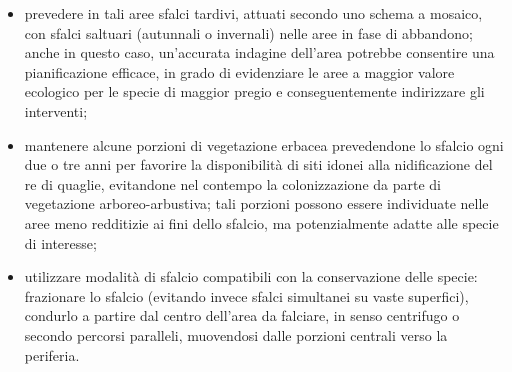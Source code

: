\documentclass[10pt,twoside,openany,x11names,svgnames,italian,a5paper,dvipsnames,table]{memoir}
\begin{document}
\begin{itemize}\itemsep0pt
  \item prevedere in tali aree sfalci tardivi, attuati secondo uno schema a mosaico, con sfalci saltuari (autunnali o invernali) nelle aree in fase di abbandono; anche in questo caso, un’accurata indagine dell’area potrebbe consentire una pianificazione efficace, in grado di evidenziare le aree a maggior valore ecologico per le specie di maggior pregio e conseguentemente indirizzare gli interventi;
  \item mantenere alcune porzioni di vegetazione erbacea prevedendone lo sfalcio ogni due o tre anni per favorire la disponibilità di siti idonei alla nidificazione del re di quaglie, evitandone nel contempo la colonizzazione da parte di vegetazione arboreo-arbustiva; tali porzioni possono essere individuate nelle aree meno redditizie ai fini dello sfalcio, ma potenzialmente adatte alle specie di interesse;
  \item utilizzare modalità di sfalcio compatibili con la conservazione delle specie: frazionare lo sfalcio (evitando invece sfalci simultanei su vaste superfici), condurlo a partire dal centro dell’area da falciare, in senso centrifugo o secondo percorsi paralleli, muovendosi dalle porzioni centrali verso la periferia.
\end{itemize}
\end{document}
